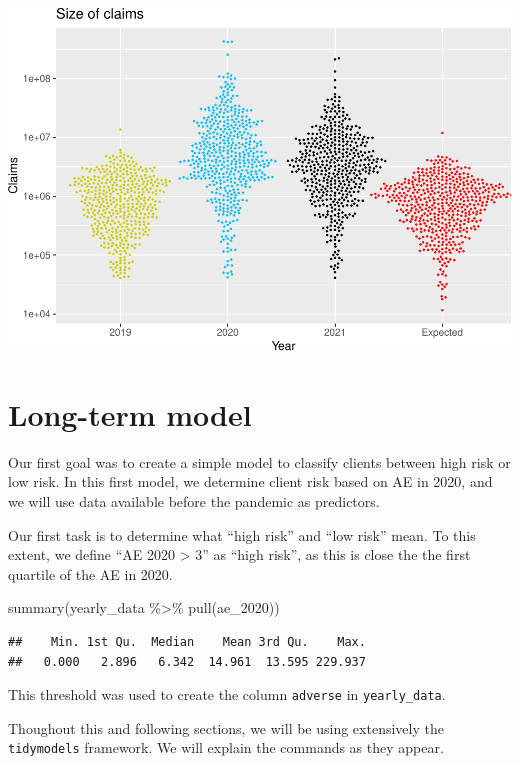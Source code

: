 \documentclass[
]{article}
\newenvironment{Shaded}{\begin{snugshade}}{\end{snugshade}}
\newcommand{\FunctionTok}[1]{\textcolor[rgb]{0.00,0.00,0.00}{#1}}
\newcommand{\NormalTok}[1]{#1}
\newcommand{\SpecialCharTok}[1]{\textcolor[rgb]{0.00,0.00,0.00}{#1}}
\begin{document}
\includegraphics{figures/report/fig-unnamed-chunk-10-1.pdf}

\hypertarget{long-term-model}{%
\section{Long-term model}\label{long-term-model}}

Our first goal was to create a simple model to classify clients between
high risk or low risk. In this first model, we determine client risk
based on AE in 2020, and we will use data available before the pandemic
as predictors.

Our first task is to determine what ``high risk'' and ``low risk'' mean.
To this extent, we define ``AE 2020 \textgreater{} 3'' as ``high risk'',
as this is close the the first quartile of the AE in 2020.

\begin{Shaded}
\begin{Highlighting}[]
\FunctionTok{summary}\NormalTok{(yearly\_data }\SpecialCharTok{\%\textgreater{}\%} \FunctionTok{pull}\NormalTok{(ae\_2020))}
\end{Highlighting}
\end{Shaded}

\begin{verbatim}
##    Min. 1st Qu.  Median    Mean 3rd Qu.    Max. 
##   0.000   2.896   6.342  14.961  13.595 229.937
\end{verbatim}

This threshold was used to create the column \texttt{adverse} in
\texttt{yearly\_data}.

Thoughout this and following sections, we will be using extensively the
\texttt{tidymodels} framework. We will explain the commands as they
appear.
\end{document}
